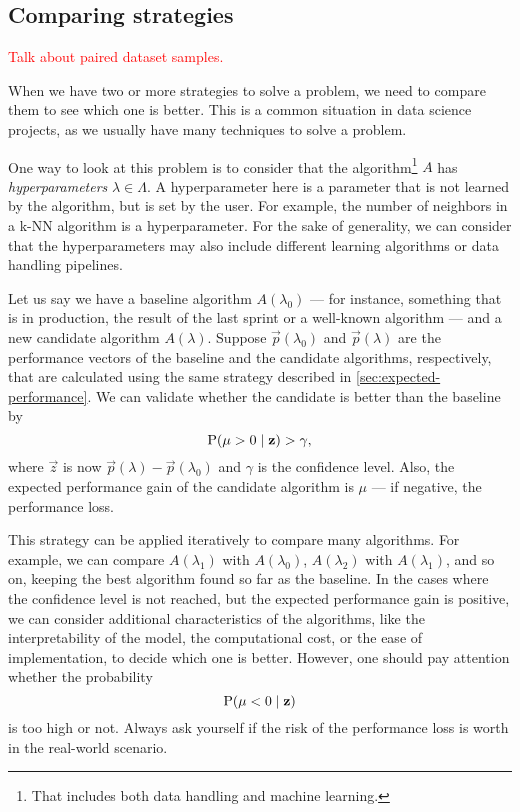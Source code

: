 \subsection{Comparing strategies}
\label{sub:comparison}

\textcolor{red}{Talk about paired dataset samples.}

When we have two or more strategies to solve a problem, we need to compare them to see
which one is better.  This is a common situation in data science projects, as we usually
have many techniques to solve a problem.

One way to look at this problem is to consider that the algorithm\footnote{That includes
both data handling and machine learning.} $A$ has \emph{hyperparameters} $\lambda \in
\Lambda$.  A hyperparameter here is a parameter that is not learned by the algorithm, but
is set by the user.  For example, the number of neighbors in a k-NN algorithm is a
hyperparameter.  For the sake of generality, we can consider that the hyperparameters may
also include different learning algorithms or data handling pipelines.

Let us say we have a baseline algorithm $A(\lambda_0)$ --- for instance, something that is
in production, the result of the last sprint or a well-known algorithm --- and a new candidate algorithm $A(\lambda)$.
Suppose $\vec{p}(\lambda_0)$ and $\vec{p}(\lambda)$ are the performance vectors of the
baseline and the candidate algorithms, respectively, that are calculated using the same
strategy described in \cref{sec:expected-performance}.  We can validate whether the
candidate is better than the baseline by
\begin{equation*}
  \operatorname{P}(\mu > 0 \mid \mathbf{z}) > \gamma\text{,}
\end{equation*}
where $\vec{z}$ is now $\vec{p}(\lambda) - \vec{p}(\lambda_0)$ and $\gamma$ is the confidence
level.  Also, the expected performance gain of the candidate algorithm is $\mu$ --- if
negative, the performance loss.

This strategy can be applied iteratively to compare many algorithms.  For example, we can
compare $A(\lambda_1)$ with $A(\lambda_0)$, $A(\lambda_2)$ with $A(\lambda_1)$, and so on,
keeping the best algorithm found so far as the baseline. In the cases where the confidence
level is not reached, but the expected performance gain is positive, we can consider
additional characteristics of the algorithms, like the interpretability of the model, the
computational cost, or the ease of implementation, to decide which one is better. However,
one should pay attention whether the probability
\begin{equation*}
  \operatorname{P}(\mu < 0 \mid \mathbf{z})
\end{equation*}
is too high or not.  Always ask yourself if the risk of the performance loss is worth in
the real-world scenario.

